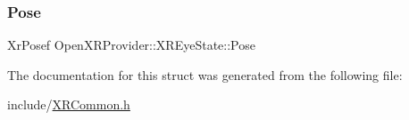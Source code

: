\subsubsection{\texorpdfstring{Pose}{Pose}}
{\footnotesize\ttfamily Xr\+Posef Open\+X\+R\+Provider\+::\+X\+R\+Eye\+State\+::\+Pose}



The documentation for this struct was generated from the following file\+:\begin{DoxyCompactItemize}
\item 
include/\mbox{\hyperlink{_x_r_common_8h}{X\+R\+Common.\+h}}\end{DoxyCompactItemize}
